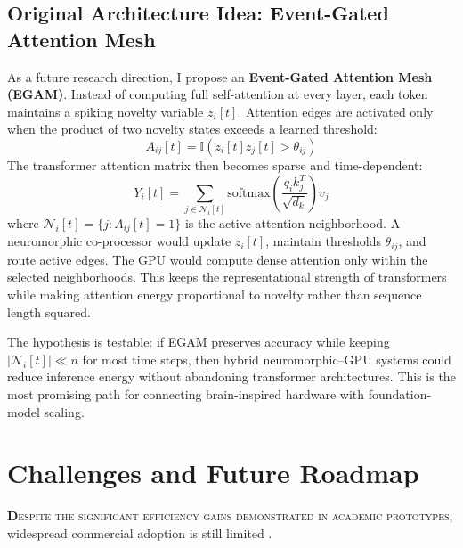 \documentclass[11pt]{article}
\newcommand{\sectionlead}[2]{\noindent\lettrine[lines=2,lhang=0.08,nindent=0.12em]{\textcolor{IEEEblue}{\bfseries #1}}{\hspace{0.03em}#2}}
\begin{document}
\subsection{Original Architecture Idea: Event-Gated Attention Mesh}
As a future research direction, I propose an \textbf{Event-Gated Attention Mesh (EGAM)}. Instead of computing full self-attention at every layer, each token maintains a spiking novelty variable $z_i[t]$. Attention edges are activated only when the product of two novelty states exceeds a learned threshold:
$$A_{ij}[t]=\mathbb{I}\left(z_i[t]z_j[t]>\theta_{ij}\right)$$
The transformer attention matrix then becomes sparse and time-dependent:
$$Y_i[t]=\sum_{j\in\mathcal{N}_i[t]} \text{softmax}\left(\frac{q_i k_j^T}{\sqrt{d_k}}\right)v_j$$
where $\mathcal{N}_i[t]=\{j:A_{ij}[t]=1\}$ is the active attention neighborhood. A neuromorphic co-processor would update $z_i[t]$, maintain thresholds $\theta_{ij}$, and route active edges. The GPU would compute dense attention only within the selected neighborhoods. This keeps the representational strength of transformers while making attention energy proportional to novelty rather than sequence length squared.

The hypothesis is testable: if EGAM preserves accuracy while keeping $|\mathcal{N}_i[t]|\ll n$ for most time steps, then hybrid neuromorphic--GPU systems could reduce inference energy without abandoning transformer architectures. This is the most promising path for connecting brain-inspired hardware with foundation-model scaling.

\section{Challenges and Future Roadmap}
\sectionlead{D}{espite the significant efficiency gains demonstrated in academic prototypes}, widespread commercial adoption is still limited \cite{kudithipudi2025scale,schuman2017survey}.
\end{document}
